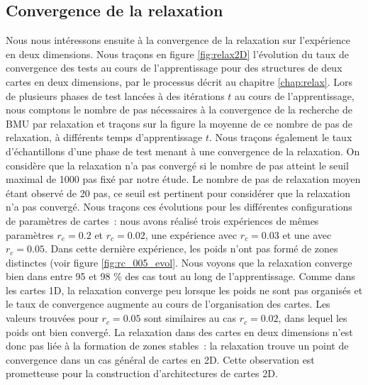 \documentclass[../main]{subfiles}
\begin{document}

\subsection{Convergence de la relaxation \label{par:conv2D}}

Nous nous intéressons ensuite à la convergence de la relaxation sur l'expérience en deux dimensions. 
Nous traçons en figure \ref{fig:relax2D} l'évolution du taux de convergence des tests au cours de l'apprentissage pour des structures de deux cartes en deux dimensions, par le processus décrit au chapitre \ref{chap:relax}. Lors de plusieurs phases de test lancées à des itérations $t$ au cours de l'apprentissage, nous comptons le nombre de pas nécessaires à la convergence de la recherche de BMU par relaxation et traçons sur la figure la moyenne de ce nombre de pas de relaxation, à différents temps d'apprentissage $t$.
Nous traçons également le taux d'échantillons d'une phase de test menant à une convergence de la relaxation. On considère que la relaxation n'a pas convergé si le nombre de pas atteint le seuil maximal de 1000 pas fixé par notre étude. Le nombre de pas de relaxation moyen étant observé de 20 pas, ce seuil est pertinent pour considérer que la relaxation n'a pas convergé.
Nous traçons ces évolutions pour les différentes configurations de paramètres de cartes~: nous avons réalisé trois expériences de mêmes paramètres $r_e=0.2$ et $r_c = 0.02$, une expérience avec $r_c = 0.03$ et une avec $r_c = 0.05$. Dans cette dernière expérience, les poids n'ont pas formé de zones distinctes (voir figure \ref{fig:rc_005_evol}.
Nous voyons que la relaxation converge bien dans entre 95 et 98 \% des cas tout au long de l'apprentissage. Comme dans les cartes 1D, la relaxation converge peu lorsque les poids ne sont pas organisés et le taux de convergence augmente au cours de l'organisation des cartes.
Les valeurs trouvées pour $r_c = 0.05$ sont similaires au cas $r_c = 0.02$, dans lequel les poids ont bien convergé. La relaxation dans des cartes en deux dimensions n'est donc pas liée à la formation de zones stables~: la relaxation trouve un point de convergence dans un cas général de cartes en 2D.
Cette observation est prometteuse pour la construction d'architectures de cartes 2D.
\end{document}

